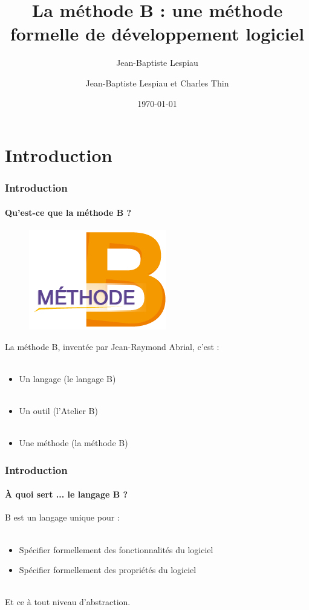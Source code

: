 \documentclass[11pt,a4paper,xcolor=table]{beamer} %
\author[]{Jean-Baptiste Lespiau}
\author{Jean-Baptiste Lespiau et Charles Thin}
\title{La méthode B : une méthode formelle de développement logiciel}
\date\today
\begin{document}
\frame{\titlepage}

\section*{Introduction}

\begin{frame}
\frametitle{Introduction}
\framesubtitle{Qu'est-ce que la méthode B ?}
\begin{figure}[h]
\includegraphics[scale=0.2]{ressources/logo1.png}
\end{figure}
La méthode B, inventée par Jean-Raymond Abrial, c'est :\\~\\
\begin{itemize}
\pause
\item Un langage (le langage B)\\~\\
\pause
\item Un outil (l'Atelier B)\\~\\
\pause
\item Une méthode (la méthode B)
\end{itemize}
\end{frame}

\begin{frame}
\frametitle{Introduction}
\framesubtitle{À quoi sert ... le langage B ?}
B est un langage unique pour :\\~\\
\pause
\begin{itemize}
\item Spécifier formellement des fonctionnalités du logiciel
\pause
\item Spécifier formellement des propriétés du logiciel
\pause
\end{itemize}
~\\
Et ce à tout niveau d'abstraction.
\end{frame}
\end{document}
